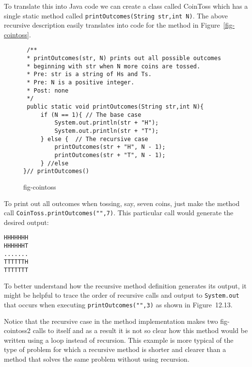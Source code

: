 To translate this into Java code we can create a class called CoinToss
which has a single static method called {\tt printOutcomes(String
str,int N)}. The above recursive description easily translates into
code for the method in Figure~\ref{fig-cointoss}.

\begin{figure}[htb] 
\jjjprogstart
\begin{jjjlisting}
\begin{lstlisting}
 /**
 * printOutcomes(str, N) prints out all possible outcomes  
 * beginning with str when N more coins are tossed.
 * Pre: str is a string of Hs and Ts.
 * Pre: N is a positive integer.
 * Post: none
 */
 public static void printOutcomes(String str,int N){
     if (N == 1){ // The base case
         System.out.println(str + "H");
         System.out.println(str + "T");
     } else {  // The recursive case
         printOutcomes(str + "H", N - 1);
         printOutcomes(str + "T", N - 1);
     } //else
}// printOutcomes()
\end{lstlisting}
\end{jjjlisting}
{fig-cointoss}
\end{figure}

To print out all outcomes when tossing, say, seven coins, just make the 
method call {\tt CoinToss.printOutcomes("",7)}.  This particular call would 
generate the desired output:

\begin{jjjlisting}
\begin{lstlisting}
HHHHHHH
HHHHHHT
.......
TTTTTTH
TTTTTTT
\end{lstlisting}
\end{jjjlisting}

\noindent To better understand how the recursive method definition generates
its output, it might be helpful to trace the order of recursive calls and
output to {\tt System.out} that occurs when executing {\tt printOutcomes("",3)}
as shown in Figure~12.13.

Notice that the recursive case in the method implementation makes two
{fig-cointoss2}
calls to itself and as a result it is not so clear how this method
would be written using a loop instead of recursion.  This example is
more typical of the type of problem for which a recursive method is
shorter and clearer than a method that solves the same problem without
using recursion.

